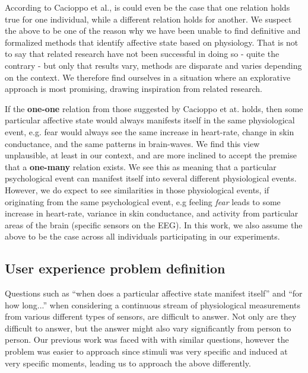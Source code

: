 According to Cacioppo et al., is could even be the case that one relation holds true for one individual, while a
different relation holds for another. We suspect the above to be one of the reason why we have been unable to find
definitive and formalized methods that identify affective state based on physiology. That is not to say that related
research have not been successful in doing so - quite the contrary - but only that results vary, methods are disparate
and varies depending on the context. We therefore find ourselves in a situation where an explorative approach is most
promising, drawing inspiration from related research.

If the \textbf{one-one} relation from those suggested by Cacioppo et at. holds, then some particular affective state
would always manifests itself in the same physiological event, e.g. fear would always see the same increase in
heart-rate, change in skin conductance, and the same patterns in brain-waves. We find this view unplausible, at least in
our context, and are more inclined to accept the premise that a \textbf{one-many} relation exists. We see this as
meaning that a particular psychological event can manifest itself into several different physiological events. However,
we do expect to see similarities in those physiological events, if originating from the same psychological event, e.g
feeling \textit{fear} leads to some increase in heart-rate, variance in skin conductance, and activity from particular
areas of the brain (specific sensors on the EEG). In this work, we also assume the above to be the case across all
individuals participating in our experiments.

\subsection{User experience problem definition}
Questions such as ``when does a particular affective state manifest itself'' and ``for how long...'' when considering a
continuous stream of physiological measurements from various different types of sensors, are difficult to answer. Not
only are they difficult to answer, but the answer might also vary significantly from person to person. Our previous work
was faced with with similar questions, however the problem was easier to approach since stimuli was very specific and
induced at very specific moments, leading us to approach the above differently.


